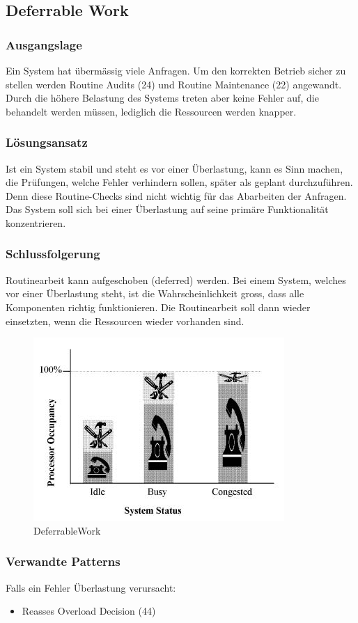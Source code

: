 \subsection{Deferrable Work}

\subsubsection*{Ausgangslage}

Ein System hat übermässig viele Anfragen. Um den korrekten Betrieb sicher zu stellen werden Routine Audits (24) und Routine Maintenance (22) angewandt. Durch die höhere Belastung des Systems treten aber keine Fehler auf, die behandelt werden müssen, lediglich die Ressourcen werden knapper.

\subsubsection*{Lösungsansatz}

Ist ein System stabil und steht es vor einer Überlastung, kann es Sinn machen, die Prüfungen, welche Fehler verhindern sollen, später als geplant durchzuführen. Denn diese Routine-Checks sind nicht wichtig für das Abarbeiten der Anfragen. Das System soll sich bei einer Überlastung auf seine primäre Funktionalität konzentrieren.

\subsubsection*{Schlussfolgerung}

Routinearbeit kann aufgeschoben (deferred) werden. Bei einem System, welches vor einer Überlastung steht, ist die Wahrscheinlichkeit gross, dass alle Komponenten richtig funktionieren. Die Routinearbeit soll dann wieder einsetzten, wenn die Ressourcen wieder vorhanden sind.

\begin{figure}[H]
	\centering
	\includegraphics[width=\textwidth]{content/faulttolerance/images/DeferrableWork.JPG}
	\caption{DeferrableWork}
\end{figure}


\subsubsection*{Verwandte Patterns}

Falls ein Fehler Überlastung verursacht:
\begin{itemize}
	\item Reasses Overload Decision (44)
\end{itemize}



